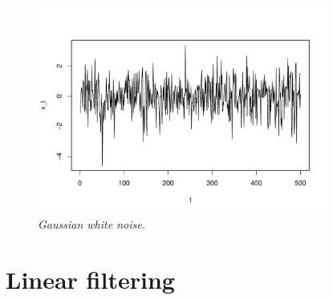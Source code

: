 \documentclass{article}
\begin{document}
\begin{figure}[ht]
\centering
\includegraphics[width=0.85\textwidth]{fig/wn-1.pdf}
\caption{\it Gaussian white noise.}
\label{fig:wn}
\end{figure}

\section{Linear filtering}
\end{document}
